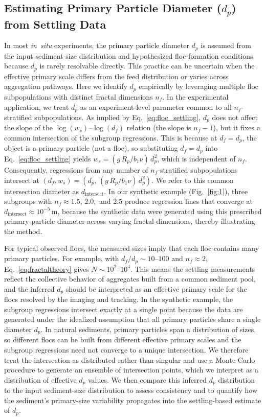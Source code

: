 \documentclass{agujournal2019}
\begin{document}
\subsection{Estimating Primary Particle Diameter ($d_p$) from Settling Data}

In most \textit{in~situ} experiments, the primary particle diameter \(d_p\) is assumed from the input sediment-size distribution and hypothesized floc-formation conditions because \(d_p\) is rarely resolvable directly. This practice can be uncertain when the effective primary scale differs from the feed distribution or varies across aggregation pathways. Here we identify \(d_p\) empirically by leveraging multiple floc subpopulations with distinct fractal dimensions \(n_f\). In the experimental application, we treat $d_p$ as an experiment-level parameter common to all $n_f$-stratified subpopulations. As implied by Eq.~\eqref{eq:floc_settling}, \(d_p\) does not affect the slope of the \(\log(w_s)\)--\(\log(d_f)\) relation (the slope is \(n_f-1\)), but it fixes a common intersection of the subgroup regressions. This is because at \(d_f=d_p\), the object is a primary particle (not a floc), so substituting \(d_f=d_p\) into Eq.~\eqref{eq:floc_settling} yields \(w_s=(g\,R_p/b_1\nu)\,d_p^{2}\), which is independent of \(n_f\). Consequently, regressions from any number of \(n_f\)-stratified subpopulations intersect at \((d_f, w_s)=(d_p,\,(g\,R_p/b_1\nu)\,d_p^{2})\). We refer to this common intersection diameter as $d_\text{intersect}$. In our synthetic example (Fig.~\ref{fig:1}), three subgroups with \(n_f \approx 1.5,\,2.0,\) and \(2.5\) produce regression lines that converge at \(d_\text{intersect} \approx 10^{-5}\,\mathrm{m}\), because the synthetic data were generated using this prescribed primary-particle diameter across varying fractal dimensions, thereby illustrating the method.


For typical observed flocs, the measured sizes imply that each floc contains many primary particles. For example, with $d_f/d_p \sim 10$--$100$ and $n_f \approx 2$, Eq.~\eqref{eq:fractaltheory} gives $N \sim 10^{2}$--$10^{4}$. This means the settling measurements reflect the collective behavior of aggregates built from a common sediment pool, and the inferred $d_p$ should be interpreted as an effective primary scale for the flocs resolved by the imaging and tracking. In the synthetic example, the subgroup regressions intersect exactly at a single point because the data are generated under the idealized assumption that all primary particles share a single diameter $d_p$. In natural sediments, primary particles span a distribution of sizes, so different flocs can be built from different effective primary scales and the subgroup regressions need not converge to a unique intersection. We therefore treat the intersection as distributed rather than singular and use a Monte Carlo procedure to generate an ensemble of intersection points, which we interpret as a distribution of effective $d_p$ values. We then compare this inferred $d_p$ distribution to the input sediment-size distribution to assess consistency and to quantify how the sediment's primary-size variability propagates into the settling-based estimate of $d_p$.
\end{document}
